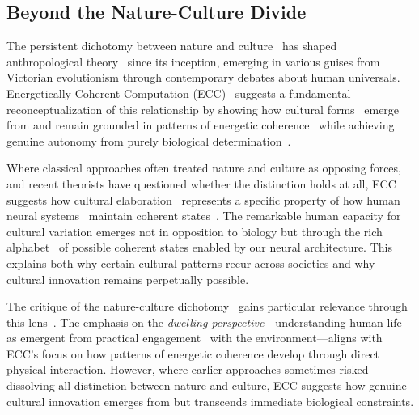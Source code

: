 \subsection*{Beyond the Nature-Culture Divide}

The persistent dichotomy between nature and culture~ has shaped anthropological theory~ since its inception, emerging in various guises from Victorian evolutionism through contemporary debates about human universals. Energetically Coherent Computation (ECC)~ suggests a fundamental reconceptualization of this relationship by showing how cultural forms~ emerge from and remain grounded in patterns of energetic coherence~ while achieving genuine autonomy from purely biological determination~\cite{descola2013beyond,strathern2004partial}.

Where classical approaches often treated nature and culture as opposing forces, and recent theorists have questioned whether the distinction holds at all, ECC suggests how cultural elaboration~ represents a specific property of how human neural systems~ maintain coherent states~\cite{latour2005reassembling,viveiros2014cannibal}. The remarkable human capacity for cultural variation emerges not in opposition to biology but through the rich alphabet~ of possible coherent states enabled by our neural architecture. This explains both why certain cultural patterns recur across societies and why cultural innovation remains perpetually possible.

The critique of the nature-culture dichotomy~ gains particular relevance through this lens~\cite{ingold2011being,kohn2013how}. The emphasis on the \textit{dwelling perspective}—understanding human life as emergent from practical engagement~ with the environment—aligns with ECC's focus on how patterns of energetic coherence develop through direct physical interaction. However, where earlier approaches sometimes risked dissolving all distinction between nature and culture, ECC suggests how genuine cultural innovation emerges from but transcends immediate biological constraints.

